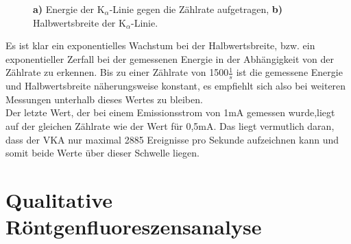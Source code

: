 \begin{figure}[h]
	\centering
	\caption{\textbf{a)} Energie der K$_\alpha$-Linie gegen die Zählrate aufgetragen, \textbf{b)} Halbwertsbreite der K$_\alpha$-Linie.}
	\label{fig:a2_energie_breite}
\end{figure}

Es ist klar ein exponentielles Wachstum bei der Halbwertsbreite, bzw. ein exponentieller Zerfall bei der gemessenen Energie in der Abhängigkeit von der Zählrate zu erkennen. Bis zu einer Zählrate von 1500\;$\frac{1}{s}$ ist die gemessene Energie und Halbwertsbreite näherungsweise konstant, es empfiehlt sich also bei weiteren Messungen unterhalb dieses Wertes zu bleiben.\\
Der letzte Wert, der bei einem Emissionsstrom von 1\;mA gemessen wurde,liegt auf der gleichen Zählrate wie der Wert für 0,5\;mA. Das liegt vermutlich daran, dass der VKA nur maximal 2885 Ereignisse pro Sekunde aufzeichnen kann und somit beide Werte über dieser Schwelle liegen.\\

\section{Qualitative Röntgenfluoreszensanalyse}


